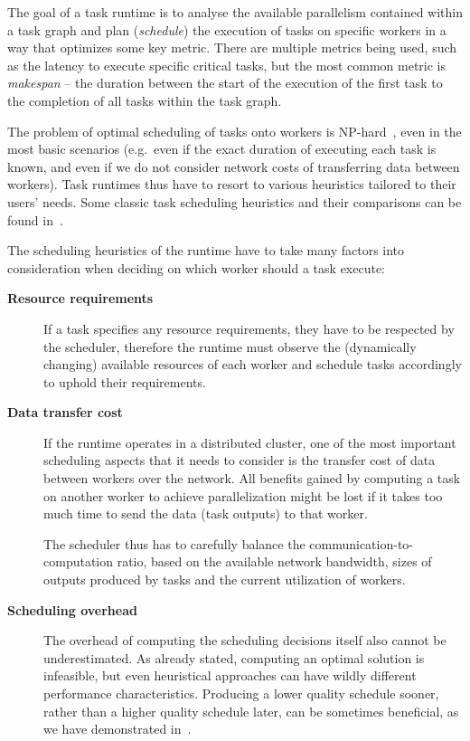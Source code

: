 The goal of a task runtime is to analyse the available parallelism contained within a task graph
and plan (\emph{schedule}) the execution of tasks on specific workers in a way that
optimizes some key metric. There are multiple metrics being used, such as the latency to execute
specific critical tasks, but the most common metric is \emph{makespan} -- the duration
between the start of the execution of the first task to the completion of all tasks within the task
graph.

The problem of optimal scheduling of tasks onto workers is NP-hard~\cite{Ullman1975}, even in
the most basic scenarios (e.g.\ even if the exact duration of executing each task is known, and
even if we do not consider network costs of transferring data between workers). Task runtimes thus
have to resort to various heuristics tailored to their users' needs. Some classic task scheduling
heuristics and their comparisons can be found in~\cite{hlfet1974,kwok1998benchmarking,hagras2003static,wang2018list,estee}.

The scheduling heuristics of the runtime have to take many factors into consideration when deciding
on which worker should a task execute:

\begin{description}
	\item[\textbf{Resource requirements}] If a task specifies any resource requirements, they have to be respected by the scheduler,
		therefore the runtime must observe the (dynamically changing) available resources of each worker
		and schedule tasks accordingly to uphold their requirements.
	\item[\textbf{Data transfer cost}] If the runtime operates in a distributed cluster, one of the most important scheduling aspects that
		it needs to consider is the transfer cost of data between workers over the network. All benefits
		gained by computing a task on another worker to achieve parallelization might be lost if it takes
		too much time to send the data (task outputs) to that worker.

		The scheduler thus has to carefully balance the communication-to-computation ratio, based on the
		available network bandwidth, sizes of outputs produced by tasks and the current utilization of
		workers.
	\item[\textbf{Scheduling overhead}] The overhead of computing the scheduling decisions itself also cannot be underestimated. As already
		stated, computing an optimal solution is infeasible, but even heuristical approaches can have
		wildly different performance characteristics. Producing a lower quality schedule sooner, rather
		than a higher quality schedule later, can be sometimes beneficial, as we have demonstrated
		in~\cite{rsds}.
\end{description}
